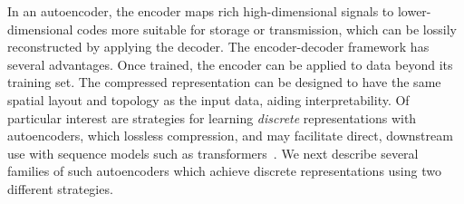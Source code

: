 
%
In an autoencoder, the encoder maps rich high-dimensional signals to lower-dimensional codes more suitable for storage or transmission, which can be lossily reconstructed by applying the decoder.
The encoder-decoder framework has several advantages. Once trained, the encoder can be applied to data beyond its training set. The compressed representation can be designed to have the same spatial layout and topology as the input data, aiding interpretability. Of particular interest are strategies for learning \emph{discrete} representations with autoencoders, which lossless compression, and may facilitate direct, downstream use with sequence models such as transformers~\citep{vaswani2017transformer, nguyen2023climax}.
We next describe several families of such autoencoders which achieve discrete representations using two different strategies.





